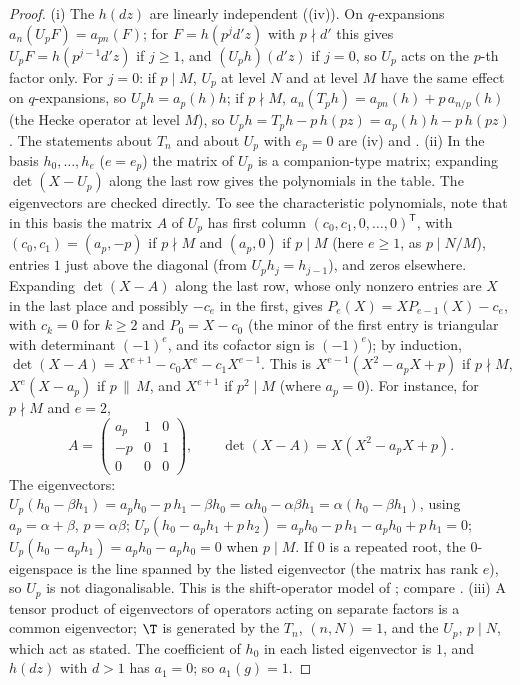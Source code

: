 \begin{proof}
(i) The $h(dz)$ are linearly independent ((iv)). On $q$-expansions $a_n(U_pF)=a_{pn}(F)$; for $F=h(p^jd'z)$ with $p\nmid d'$ this gives
$U_pF=h(p^{j-1}d'z)$ if $j\ge1$, and $(U_ph)(d'z)$ if $j=0$, so $U_p$ acts on the $p$-th factor only. For $j=0$: if $p\mid M$, $U_p$ at level $N$ and at level $M$ have the
same effect on $q$-expansions, so $U_ph=a_p(h)h$; if $p\nmid M$, $a_n(T_ph)=a_{pn}(h)+p\,a_{n/p}(h)$ (the Hecke operator at level $M$), so $U_ph=T_ph-p\,h(pz)=a_p(h)h-p\,h(pz)$.
The statements about $T_n$ and about $U_p$ with $e_p=0$ are (iv) and . (ii) In the basis $h_0,\dots,h_{e}$ ($e=e_p$) the
matrix of $U_p$ is a companion-type matrix; expanding $\det(X-U_p)$ along the last row gives the polynomials in the table. The eigenvectors are
checked directly. To see the characteristic polynomials, note that in this basis the matrix $A$ of $U_p$ has first column $(c_0,c_1,0,\dots,0)^{\mathsf T}$, with
$(c_0,c_1)=(a_p,-p)$ if $p\nmid M$ and $(a_p,0)$ if $p\mid M$ (here $e\ge1$, as $p\mid N/M$), entries $1$ just above the diagonal (from $U_ph_j=h_{j-1}$), and zeros elsewhere. Expanding
$\det(X-A)$ along the last row, whose only nonzero entries are $X$ in the last place and possibly $-c_e$ in the first, gives $P_e(X)=XP_{e-1}(X)-c_e$, with $c_k=0$ for $k\ge2$ and $P_0=X-c_0$ (the minor of the first entry is
triangular with determinant $(-1)^e$, and its cofactor sign is $(-1)^e$); by induction, $\det(X-A)=X^{e+1}-c_0X^e-c_1X^{e-1}$. This is $X^{e-1}(X^2-a_pX+p)$ if $p\nmid M$, $X^e(X-a_p)$ if $p\,\|\,M$, and
$X^{e+1}$ if $p^2\mid M$ (where $a_p=0$). For instance, for $p\nmid M$ and $e=2$,
\[
A=\begin{pmatrix}a_p&1&0\\-p&0&1\\0&0&0\end{pmatrix},\qquad \det(X-A)=X(X^2-a_pX+p).
\]
The eigenvectors: $U_p(h_0-\beta h_1)=a_ph_0-p\,h_1-\beta h_0=\alpha h_0-\alpha\beta h_1=\alpha(h_0-\beta h_1)$, using $a_p=\alpha+\beta$, $p=\alpha\beta$; $U_p(h_0-a_ph_1+p\,h_2)=a_ph_0-p\,h_1-a_ph_0+p\,h_1=0$;
$U_p(h_0-a_ph_1)=a_ph_0-a_ph_0=0$ when $p\mid M$. If $0$ is a repeated root, the $0$-eigenspace is the line spanned by the listed eigenvector (the matrix has
rank $e$), so $U_p$ is not diagonalisable. This is the shift-operator model of ; compare . (iii) A tensor product of
eigenvectors of operators acting on separate factors is a common eigenvector; $\T$ is generated by the $T_n$, $(n,N)=1$, and the $U_p$, $p\mid N$, which act as
stated. The coefficient of $h_0$ in each listed eigenvector is $1$, and $h(dz)$ with $d>1$ has $a_1=0$; so $a_1(g)=1$.
\end{proof}

